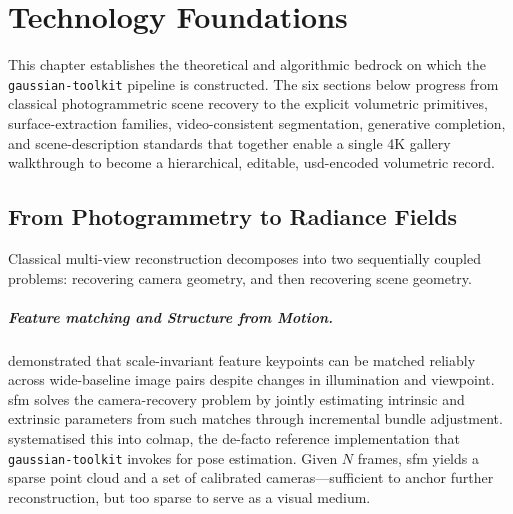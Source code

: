 %

\chapter{Technology Foundations}\label{ch:foundations}

This chapter establishes the theoretical and algorithmic bedrock on which the
\texttt{gaussian-toolkit} pipeline is constructed. The six sections below
progress from classical photogrammetric scene recovery to the explicit volumetric
primitives, surface-extraction families, video-consistent segmentation, generative
completion, and scene-description standards that together enable a single 4K
gallery walkthrough to become a hierarchical, editable, \acrshort{usd}-encoded
volumetric record.

\section{From Photogrammetry to Radiance Fields}\label{sec:sfm-to-nerf}

Classical multi-view reconstruction decomposes into two sequentially coupled
problems: recovering camera geometry, and then recovering scene geometry.

\paragraph{Feature matching and Structure from Motion.}
\textcite{Lowe2004} demonstrated that scale-invariant feature keypoints can be
matched reliably across wide-baseline image pairs despite changes in illumination
and viewpoint. \acrshort{sfm} solves the camera-recovery problem by jointly
estimating intrinsic and extrinsic parameters from such matches through
incremental bundle adjustment. \textcite{Schoenberger2016sfm} systematised this
into \acrshort{colmap}, the de-facto reference implementation that
\texttt{gaussian-toolkit} invokes for pose estimation. Given $N$ frames, \acrshort{sfm}
yields a sparse point cloud and a set of calibrated cameras---sufficient to
anchor further reconstruction, but too sparse to serve as a visual medium.

